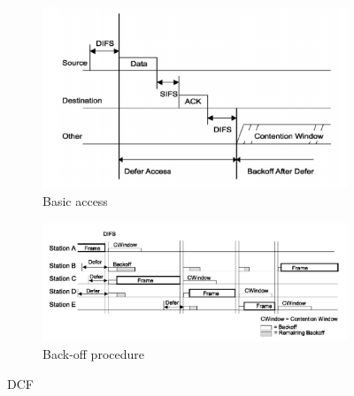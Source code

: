 \begin{figure}[h!]
\centering
\begin{subfigure}{.4\textwidth}
  \centering
    \includegraphics[width=1.1\textwidth]{figures/dcf-basic-access.png}
    \caption[Basic access]{Basic access \cite[p. 838]{ieee-802.11-2012}}
    \label{fig:dcf-basic-access}
\end{subfigure}%
\begin{subfigure}{0.6\textwidth}
  \centering
  \includegraphics[width=1.1\textwidth]{figures/dcf-backoff.png}
  \caption[Back-off procedure]{Back-off procedure \cite[p. 839]{ieee-802.11-2012}}
  \label{fig:dcf-back-off}
\end{subfigure}
\caption{\acf{DCF}}
\end{figure}